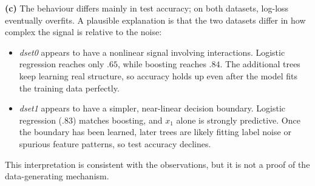 \documentclass[11pt]{article}
\begin{document}
\textbf{(c)} The behaviour differs mainly in test accuracy; on both datasets, log-loss eventually overfits. A plausible explanation is that the two datasets differ in how complex the signal is relative to the noise:
\begin{itemize}[nosep]
\item \emph{dset0} appears to have a nonlinear signal involving interactions. Logistic regression reaches only $.65$, while boosting reaches $.84$. The additional trees keep learning real structure, so accuracy holds up even after the model fits the training data perfectly.
\item \emph{dset1} appears to have a simpler, near-linear decision boundary. Logistic regression ($.83$) matches boosting, and $x_1$ alone is strongly predictive. Once the boundary has been learned, later trees are likely fitting label noise or spurious feature patterns, so test accuracy declines.
\end{itemize}
This interpretation is consistent with the observations, but it is not a proof of the data-generating mechanism.
\end{document}

